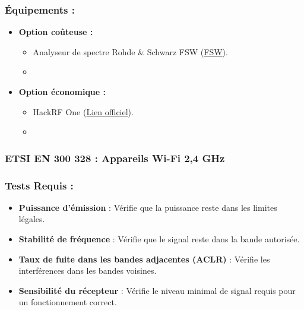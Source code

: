 \documentclass[a4paper,12pt]{article}
\begin{document}
\subsubsection*{Équipements :}
\begin{itemize}
    \item \textbf{Option coûteuse :}
          \begin{itemize}
              \item Analyseur de spectre Rohde \& Schwarz FSW (\href{https://www.rohde-schwarz.com/product/FSW.html}{FSW}).
              \item %
          \end{itemize}
    \item \textbf{Option économique :}
          \begin{itemize}
              \item HackRF One (\href{https://greatscottgadgets.com/hackrf/one/}{Lien officiel}).
              \item %
          \end{itemize}
\end{itemize}

\subsubsection{ETSI EN 300 328 : Appareils Wi-Fi 2,4 GHz}
\subsubsection*{Tests Requis :}
\begin{itemize}
    \item \textbf{Puissance d’émission} : Vérifie que la puissance reste dans les limites légales.
    \item \textbf{Stabilité de fréquence} : Vérifie que le signal reste dans la bande autorisée.
    \item \textbf{Taux de fuite dans les bandes adjacentes (ACLR)} : Vérifie les interférences dans les bandes voisines.
    \item \textbf{Sensibilité du récepteur} : Vérifie le niveau minimal de signal requis pour un fonctionnement correct.
\end{itemize}
\end{document}
